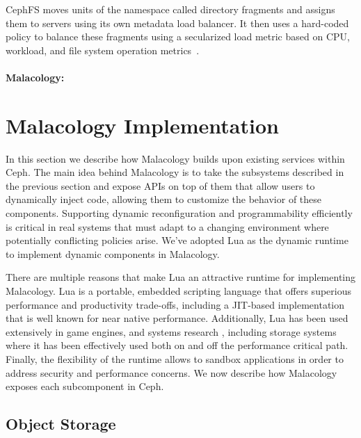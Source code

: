 \documentclass[10pt,twocolumn]{article}
\begin{document}
CephFS moves units of the namespace called directory fragments and assigns them to servers using  its own metadata load balancer. It then uses a hard-coded policy to balance these fragments using a secularized load metric based on CPU, workload, and file system operation metrics~\cite{sevilla:sc15-mantle}.

\paragraph*{Malacology:}

\section{Malacology Implementation}
\label{implementation}

In this section we describe how Malacology builds upon existing
services within Ceph. The main idea behind Malacology is to take the subsystems 
described in the previous section and expose APIs on top of them that allow 
users to dynamically inject code, allowing them to customize the behavior of 
these components. Supporting dynamic reconfiguration and programmability 
efficiently is critical in real systems that must adapt to a changing 
environment where potentially
conflicting policies arise. We've adopted Lua as the dynamic runtime  to
implement dynamic components in Malacology.

There are multiple reasons that make Lua an attractive runtime for implementing 
Malacology. Lua is a portable, embedded
scripting language that offers superious performance and productivity
trade-offs, including a JIT-based implementation that is well known for near
native performance. Additionally, Lua has been used extensively in game engines, 
and systems research \cite{neto:dls14-luaos}, including storage systems where it 
has been effectively used both on
\cite{grawinkel:pdsw2012-lua,watkins2013:bdmc13-in-vivo,geambasu_comet_2010} and 
off
\cite{sevilla:sc15-mantle} the performance critical path. Finally, the 
flexibility of the runtime allows to sandbox applications in order to address 
security and performance concerns. We now describe how Malacology exposes each 
subcomponent in Ceph.

\subsection{Object Storage}

%
\end{document}
